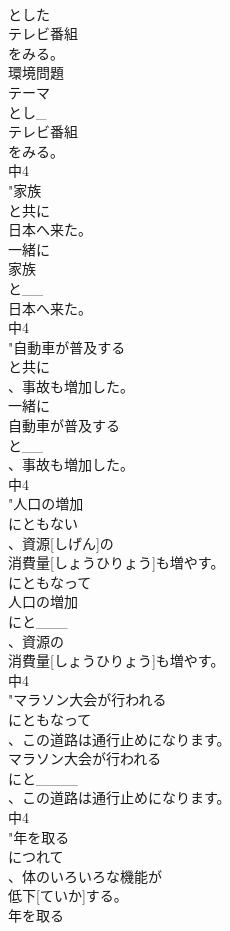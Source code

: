 \documentclass[8pt]{extreport}
\begin{document}
\begin{CJK}{UTF8}{min}
\\	とした
\\	テレビ番組
\\	をみる。
\\	環境問題
\\	テーマ
\\	とし_
\\	テレビ番組
\\	をみる。
\\	中4
\\	"家族
\\	と共に
\\	日本へ来た。
\\	一緒に 
\\	家族
\\	と__
\\	日本へ来た。
\\	中4
\\	"自動車が普及する
\\	と共に
\\	、事故も増加した。
\\	一緒に 
\\	自動車が普及する
\\	と__
\\	、事故も増加した。
\\	中4
\\	"人口の増加
\\	にともない
\\	、資源[しげん]の
\\	消費量[しょうひりょう]も増やす。
\\	にともなって
\\	人口の増加
\\	にと___
\\	、資源の
\\	消費量[しょうひりょう]も増やす。
\\	中4
\\	"マラソン大会が行われる
\\	にともなって
\\	、この道路は通行止めになります。
\\	マラソン大会が行われる
\\	にと____
\\	、この道路は通行止めになります。
\\	中4
\\	"年を取る
\\	につれて
\\	、体のいろいろな機能が
\\	低下[ていか]する。
\\	年を取る

\end{CJK}
\end{document}
